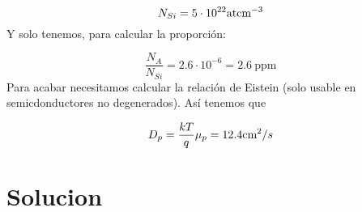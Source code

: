 \begin{texercise}
\begin{enumerate}[label=\alph*)]
		\begin{equation}
			N_{Si} = 5 \cdot 10^{22} \text{at} \text{cm}^{-3}
		\end{equation}
		Y solo tenemos, para calcular la proporción:

		\begin{equation}
			\frac{N_A}{N_{Si}} = 2.6 \cdot 10^{-6} = 2.6 \ \text{ppm}
		\end{equation}
		Para acabar necesitamos calcular la relación de Eistein (solo usable en semicdonductores no degenerados). Así tenemos que 

		\begin{equation}
			D_p = \frac{kT}{q} \mu_p = 12.4 \text{cm}^2 / s
		\end{equation}
	\end{enumerate}
	
\end{texercise}



\tcbstoprecording

\section{Solucion}

\tcbinputrecords






